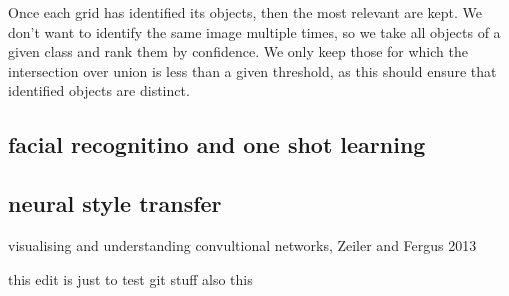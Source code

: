 \documentclass{article}
\begin{document}
Once each grid has identified its objects, then the most relevant are kept. We don't want to identify the same image multiple times, so we take all objects of a given class and rank them by confidence. We only keep those for which the intersection over union is less than a given threshold, as this should ensure that identified objects are distinct.

\subsection{facial recognitino and one shot learning}


\subsection{neural style transfer}
visualising and understanding convultional networks, Zeiler and Fergus 2013


this edit is just to test git stuff
also this
\end{document}
